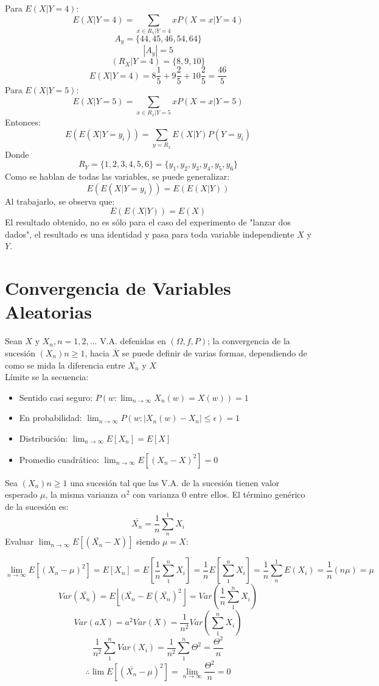 \documentclass[11pt,fleqn]{book} %
\numberwithin{equation}{section} %
\numberwithin{figure}{section} %
\numberwithin{table}{section} %
\begin{document}
\begin{itemize}
Para $E(X|Y=4)$: 
$$E(X|Y=4)=\sum_{x\in R_x|Y=4}xP(X=x|Y=4)$$ $$A_y=\lbrace 44,45,46,54,64\rbrace$$ $$|A_y|=5$$ $$(R_X|Y=4)=\lbrace 8,9,10\rbrace$$ $$E(X|Y=4)=8\frac{1}{5}+9\frac{2}{5}+10\frac{2}{5}=\frac{46}{5}$$
Para $E(X|Y=5)$: 
$$E(X|Y=5)=\sum_{x\in R_x|Y=5}xP(X=x|Y=5)$$ 
Entonces:
$$E(E(X|Y=y_i))=\sum_{y=R_x}E(X|Y)P(Y=y_i)$$
Donde 
$$R_Y=\lbrace 1,2,3,4,5,6\rbrace=\lbrace y_1,y_2,y_3,y_4,y_5,y_6\rbrace$$ 
Como se hablan de todas las variables, se puede generalizar: 
$$E(E(X|Y=y_i))=E(E(X|Y))$$ 
Al trabajarlo, se observa que: 
$$E(E(X|Y))=E(X)$$ 
El resultado obtenido, no es sólo para el caso del experimento de "lanzar dos dados", el resultado es una identidad y pasa para toda variable independiente $X$ y $Y$. 
\end{itemize}
\section{Convergencia de Variables Aleatorias}
Sean $X$ y $X_n, n=1,2,...$ V.A. defenidas en $(\Omega ,f,P)$; la convergencia de la sucesión $(X_n)n\geq 1$, hacia $\overline{X}$ se puede definir de varias formas, dependiendo de como se mida la diferencia entre $X_{n}$ y $X$
\ \\%
Límite se la secuencia:
\begin{itemize}
    \item Sentido casi seguro: $P( w: \lim_{n \to \infty} X_{n}(w) = X(w)) = 1$
    \item En probabilidad: $ \lim_{n \to \infty} P(w:| X_{n}(w)-X_{n}|\leq \epsilon) = 1 $
    \item Distribución: $ \lim_{n \to \infty} E[X_{n}] = E[X] $
    \item Promedio cuadrático: $ \lim_{n \to \infty} E[(X_{n}-X)^2] = 0$
\end{itemize}
Sea $(X_n)n\geq 1$ una sucesión tal que las V.A. de la sucesión tienen valor esperado $\mu$, la misma varianza $\alpha ^{2}$ con varianza $0$ entre ellos. El término genérico de la sucesión es:
$$\bar{X_n}=\frac{1}{n}\sum_{n}^{1}X_i$$
Evaluar $\lim_{n\rightarrow \infty }E[(\bar{X_n}-X)]$ siendo $\mu=X$:

$$\lim_{n\rightarrow \infty }E[({X_n}-\mu)^2] = E[{X_n}] = E[ \frac{1}{n}\sum_{1}^{n}X_i] = \frac{1}{n}E[ \sum_{1}^{n}X_{i}] =\frac{1}{n}\sum_{n}^{1}E(X_i) = \frac{1}{n}(n\mu)=\mu $$
$$Var(\bar{X_n})=E\left \lfloor (\bar{X_n}-E(\bar{X_n})^2 \right \rfloor =Var(\frac{1}{n}\sum_{1}^{n}X_i)$$
$$Var(aX)=a^2Var(X) =\frac{1}{n^2}Var(\sum_{1}^{n}X_i) $$
$$ \frac{1}{n^2}\sum_{1}^{n}Var(X_i) =\frac{1}{n^2}\sum_{1}^{n}\Theta ^2 =\frac{\Theta ^2}{n}$$
$$\therefore \lim E\left [ (\bar{X_n}-\mu )^2 \right ]=\lim_{n\rightarrow \infty }\frac{\Theta ^2}{n}=0$$
\end{document}
